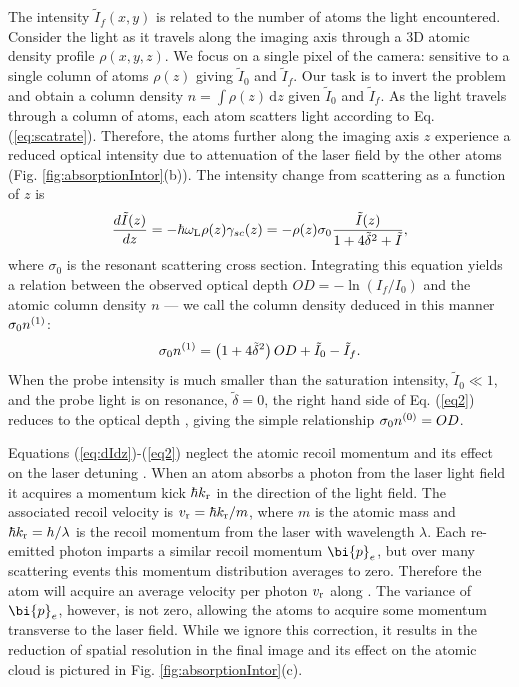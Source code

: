 \documentclass[12pt]{iopart}
\begin{document}
The intensity $\tilde{I}_f(x,y)$ is related to the number of atoms the light encountered. Consider the light as it travels along the imaging axis \ez{} through a 3D atomic density profile $\rho(x,y,z)$. We focus on a single pixel of the camera: sensitive to a single column of atoms $\rho(z)$ giving  $\tilde{I}_0$ and $\tilde{I}_f$. Our task is to invert the problem and obtain a column density $n = \int \rho\left(z\right) \,\mathrm{d}z$ given $\tilde{I}_0$ and $\tilde{I}_f$. As the light travels through a column of atoms, each atom scatters light according to Eq. (\ref{eq:scatrate}). Therefore, the atoms further along the imaging axis $z$ experience a reduced optical intensity due to attenuation of the laser field by the other atoms (Fig. \ref{fig:absorptionIntor}(b)). The intensity change from scattering as a function of $z$ is
\begin{equation}
\frac{d\tilde{I}(z)}{dz}=-\hbar\omega_{\rm{L}}\rho(z)\gamma_{sc}(z)=-\rho(z)\sigma_0\frac{\tilde{I}(z)}{1+4\tilde{\delta}^2 +\tilde{I}},
\label{eq:dIdz}
\end{equation}
where $\sigma_0$ is the resonant scattering cross section. Integrating this equation yields a relation between the observed optical depth $OD=-\ln \left(I_f/I_0\right)$ and the atomic column density $n$ \cite{Reinaudi07} --- we call the column density deduced in this manner $\sigma_0 n^{\rm{(1)}}$:
\begin{equation}
\sigma_0 n^{\rm{(1)}} = \left(1+4\tilde{\delta}^2\right)OD+ \tilde{I}_0-\tilde{I}_f.
\label{eq2}
\end{equation}
When the probe intensity is much smaller than the saturation intensity, $\tilde{I}_0\ll1$, and the probe light is on resonance, $\tilde{\delta}=0$, the right hand side of Eq. (\ref{eq2}) reduces to the optical depth \cite{Reinaudi07}, giving the simple relationship $\sigma_0 n^{\rm{(0)}}=OD$. 
\par Equations (\ref{eq:dIdz})-(\ref{eq2}) neglect the atomic recoil momentum and its effect on the laser detuning \cite{Konstantinidis12}. When an atom absorbs a photon from the laser light field it acquires a momentum kick $\hbar  k_{\rm{r}}$ in the direction of the light field. The associated recoil velocity is $v_{\rm{r}}=\hbar k_{\rm{r}}/m$, where $m$ is the atomic mass and $\hbar k_{\rm{r}}= h/\lambda$ is the recoil momentum from the laser with wavelength $\lambda$. Each re-emitted photon imparts a similar recoil momentum $\bi{p}_e$, but over many scattering events this momentum distribution averages to zero. Therefore the atom  will acquire an average velocity per photon $v_{\rm{r}}$ along \ez{}. The variance of $\bi{p}_e$, however, is not zero, allowing the atoms to acquire some momentum transverse to the laser field. While we ignore this correction, it results in the reduction of spatial resolution in the final image and its effect on the atomic cloud is pictured in Fig. \ref{fig:absorptionIntor}(c).
\end{document}
